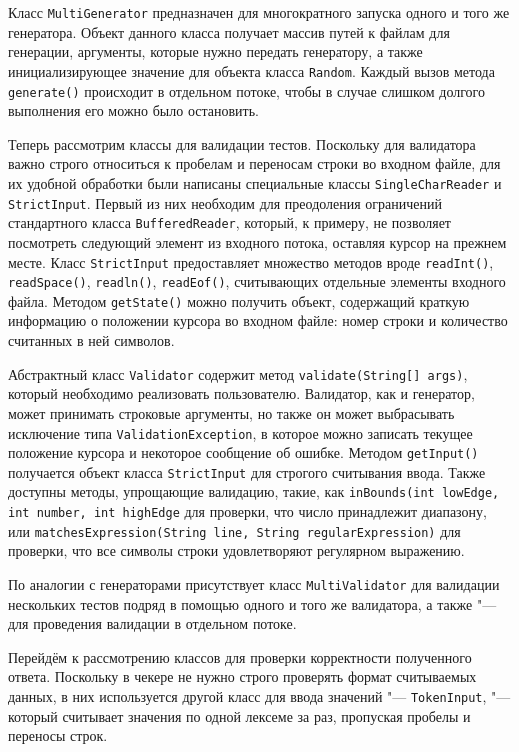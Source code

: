 Класс \texttt{MultiGenerator} предназначен для многократного запуска одного и того же генератора. Объект данного класса получает массив путей к файлам для генерации, аргументы, которые нужно передать генератору, а также инициализирующее значение для объекта класса \texttt{Random}. Каждый вызов метода \texttt{generate()} происходит в отдельном потоке, чтобы в случае слишком долгого выполнения его можно было остановить.

Теперь рассмотрим классы для валидации тестов. Поскольку для валидатора важно строго относиться к пробелам и переносам строки во входном файле, для их удобной обработки были написаны специальные классы \texttt{Single\-Char\-Reader} и \texttt{Strict\-Input}. Первый из них необходим для преодоления ограничений стандартного класса \texttt{Buffered\-Reader}, который, к примеру, не позволяет посмотреть следующий элемент из входного потока, оставляя курсор на прежнем месте. Класс \texttt{Strict\-Input} предоставляет множество методов вроде \texttt{readInt()}, \texttt{readSpace()}, \texttt{readln()}, \texttt{readEof()}, считывающих отдельные элементы входного файла. Методом \texttt{getState()} можно получить объект, содержащий краткую информацию о положении курсора во входном файле: номер строки и количество считанных в ней символов.

Абстрактный класс \texttt{Validator} содержит метод \texttt{validate(String[]~args)}, который необходимо реализовать пользователю. Валидатор, как и генератор, может принимать строковые аргументы, но также он может выбрасывать исключение типа \texttt{Validation\-Exception}, в которое можно записать текущее положение курсора и некоторое сообщение об ошибке. Методом \texttt{getInput()} получается объект класса \texttt{Strict\-Input} для строгого считывания ввода. Также доступны методы, упрощающие валидацию, такие, как \texttt{inBounds(int~lowEdge, int~number, int~highEdge} для проверки, что число принадлежит диапазону, или \texttt{matches\-Expression(String~line, String~regular\-Expression)} для проверки, что все символы строки удовлетворяют регулярном выражению.

По аналогии с генераторами присутствует класс \texttt{Multi\-Validator} для валидации нескольких тестов подряд в помощью одного и того же валидатора, а также "--- для проведения валидации в отдельном потоке.

Перейдём к рассмотрению классов для проверки корректности полученного ответа. Поскольку в чекере не нужно строго проверять формат считываемых данных, в них используется другой класс для ввода значений "--- \texttt{Token\-Input}, "--- который считывает значения по одной лексеме за раз, пропуская пробелы и переносы строк.

